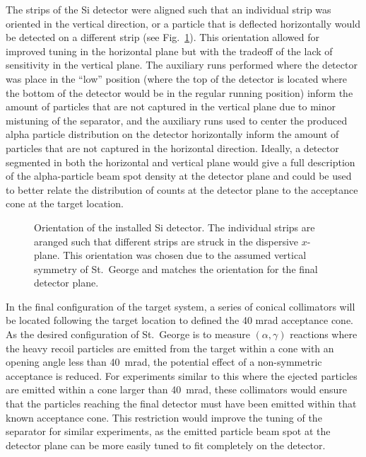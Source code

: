 The strips of the Si detector were aligned such that an individual strip
was oriented in the vertical direction, or a particle that is deflected
horizontally would be detected on a different strip (see
Fig.~\ref{fig:detector-orientation}). This orientation allowed for
improved tuning in the horizontal plane but with the tradeoff of the
lack of sensitivity in the vertical plane. The auxiliary runs performed
where the detector was place in the ``low'' position (where the top of
the detector is located where the bottom of the detector would be in the
regular running position) inform the amount of particles that are not
captured in the vertical plane due to minor mistuning of the separator,
and the auxiliary runs used to center the produced alpha particle
distribution on the detector horizontally inform the amount of particles
that are not captured in the horizontal direction. Ideally, a detector
segmented in both the horizontal and vertical plane would give a full
description of the alpha-particle beam spot density at the detector
plane and could be used to better relate the distribution of counts at
the detector plane to the acceptance cone at the target location.

\begin{figure}
    \begin{center}
        \label{fig:detector-orientation}
        \caption[Detector orientation]{Orientation of the installed Si
            detector. The individual strips are aranged such that
            different strips are struck in the dispersive $x$-plane.
            This orientation was chosen due to the assumed vertical
            symmetry of St.\ George and matches the orientation for the
            final detector plane.}
    \end{center}
\end{figure}

In the final configuration of the target system, a series of conical
collimators will be located following the target location to defined the
40 mrad acceptance cone. As the desired configuration of St.\ George is
to measure $(\alpha,\gamma)$ reactions where the heavy recoil particles
are emitted from the target within a cone with an opening angle less
than 40~mrad, the potential effect of a non-symmetric acceptance is
reduced. For experiments similar to this where the ejected particles are
emitted within a cone larger than 40~mrad, these collimators would
ensure that the particles reaching the final detector must have been
emitted within that known acceptance cone. This restriction would
improve the tuning of the separator for similar experiments, as the
emitted particle beam spot at the detector plane can be more easily
tuned to fit completely on the detector.


